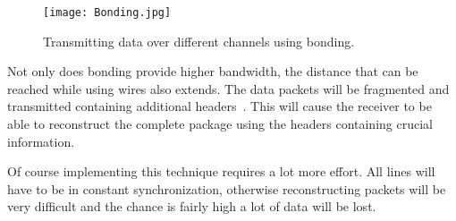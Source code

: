 \begin{figure}[H]
	\centering
	\texttt{[image: Bonding.jpg]}	
	\caption{Transmitting data over different channels using bonding.}
	\label{Fig:Bonding}
\end{figure} 

Not only does bonding provide higher bandwidth, the distance that can be reached while using wires also extends. The data packets will be fragmented and transmitted containing additional headers~\cite{Bonding_Altera}. This will cause the receiver to be able to reconstruct the complete package using the headers containing crucial information.

Of course implementing this technique requires a lot more effort. All lines will have to be in constant synchronization, otherwise reconstructing packets will be very difficult and the chance is fairly high a lot of data will be lost.
\newpage